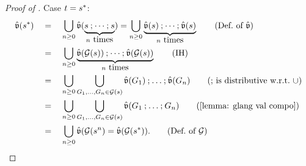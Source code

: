 \begin{proof}[Proof of ]
       Case $\term = \term[2]^*$:
       \begin{align*}
              \hat{\val}(\term[2]^{*}) & \quad=\quad \bigcup_{n \ge 0} \hat{\val}(\underbrace{\term[2]\compo \dots \compo \term[2]}_{n \mbox{ times}}) = \bigcup_{n \ge 0} \underbrace{\hat{\val}(\term[2]) \compo \dots \compo \hat{\val}(\term[2])}_{n \mbox{ times}}  \tag{Def.\ of $\hat{\val}$}                                                                    \\
                                       & \quad=\quad \bigcup_{n \ge 0} \underbrace{\hat{\val}(\glang(\term[2])) \compo \dots \compo \hat{\val}(\glang(\term[2]))}_{n \mbox{ times}} \tag{IH}                                                                  \\
                                       & \quad=\quad \bigcup_{n \ge 0} \bigcup_{\graph_1, \dots, \graph_n \in  \glang(\term[2])} \hat{\val}(\graph_1) \rcompo \ldots \rcompo \hat{\val}(\graph_n)                         \tag{$\rcompo$ is distributive w.r.t.\ $\cup$} \\
                                       & \quad=\quad \bigcup_{n \ge 0} \bigcup_{\graph_1, \dots, \graph_n \in  \glang(\term[2])} \hat{\val}(\graph_1 \compo \ldots \compo \graph_n)  \tag{\Cref{lemma: glang val compo}}                                             \\
                                       & \quad=\quad \bigcup_{n \ge 0} \hat{\val}(\glang(\term[2]^n) = \hat{\val}(\glang(\term[2]^*)). \tag{Def.\ of $\glang$}
       \end{align*}
\end{proof}